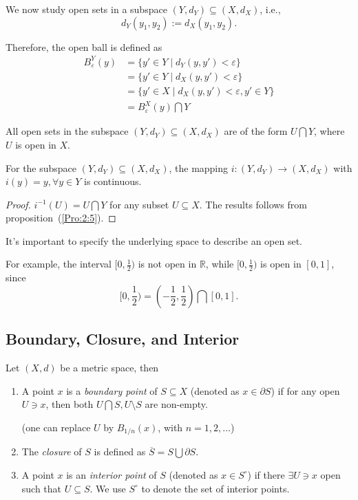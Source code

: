 We now study open sets in a subspace $(Y,d_Y)\subseteq(X,d_X)$, i.e.,
\[
d_Y(y_1,y_2):=d_X(y_1,y_2).
\]

Therefore, the open ball is defined as
\begin{align*}
B_\varepsilon^Y(y)&=\{y'\in Y\mid d_Y(y,y')<\varepsilon\}\\
&=\{y'\in Y\mid d_X(y,y')<\varepsilon\}\\
&=\{y'\in X\mid d_X(y,y')<\varepsilon, y'\in Y\}\\
&=B_\varepsilon^X(y)\bigcap Y
\end{align*}
\begin{proposition}
All open sets in the subspace $(Y,d_Y)\subseteq (X,d_X)$ are of the form $U\bigcap Y$, where $U$ is open in $X$.
\end{proposition}
\begin{corollary}
For the subspace $(Y,d_Y)\subseteq (X,d_X)$, the mapping $i:(Y,d_Y)\to(X,d_X)$ with $i(y)=y,\forall y\in Y$ is continuous.
\end{corollary}
\begin{proof}
$i^{-1}(U)=U\bigcap Y$ for any subset $U\subseteq X$. The results follows from proposition~(\ref{Pro:2:5}).
\end{proof}

\begin{remark}
It's important to specify the underlying space to describe an open set. 

For example, the interval $[0,\frac{1}{2})$ is not open in $\mathbb{R}$, while $[0,\frac{1}{2})$ is open in $[0,1]$, since
\[
[0,\frac{1}{2})
=
(-\frac{1}{2},\frac{1}{2})
\bigcap
[0,1].
\]
\end{remark}

\subsection{Boundary, Closure, and Interior}

\begin{definition}
Let $(X,d)$ be a metric space, then
\begin{enumerate}
\item
A point $x$ is a \emph{boundary point} of $S\subseteq X$ (denoted as $x\in\partial S$)
if for any open $U\ni x$, then both $U\bigcap S,U\setminus S$ are non-empty.

(one can replace $U$ by $B_{1/n}(x)$, with $n=1,2,\dots$)
\item
The \emph{closure} of $S$ is defined as $\overline{S}=S\bigcup\partial S$.
\item
A point $x$ is an \emph{interior point} of $S$ (denoted as $x\in S^\circ$) 
if there $\exists U\ni x$ open such that $U\subseteq S$. We use $S^\circ$ to denote the set of interior points.
\end{enumerate}
\end{definition}

